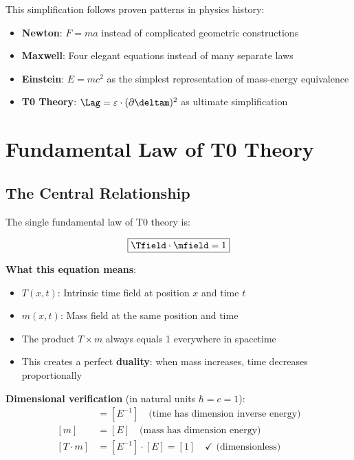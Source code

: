 	This simplification follows proven patterns in physics history:
	\begin{itemize}
		\item \textbf{Newton}: $F = ma$ instead of complicated geometric constructions
		\item \textbf{Maxwell}: Four elegant equations instead of many separate laws
		\item \textbf{Einstein}: $E = mc^2$ as the simplest representation of mass-energy equivalence
		\item \textbf{T0 Theory}: $\Lag = \varepsilon \cdot (\partial \deltam)^2$ as ultimate simplification
	\end{itemize}
	
	\section{Fundamental Law of T0 Theory}
	
	\subsection{The Central Relationship}
	
	The single fundamental law of T0 theory is:
	
	\begin{equation}
		\boxed{\Tfield \cdot \mfield = 1}
		\label{eq:fundamental_law}
	\end{equation}
	
	\textbf{What this equation means}:
	\begin{itemize}
		\item $T(x,t)$: Intrinsic time field at position $x$ and time $t$
		\item $m(x,t)$: Mass field at the same position and time
		\item The product $T \times m$ always equals 1 everywhere in spacetime
		\item This creates a perfect \textbf{duality}: when mass increases, time decreases proportionally
	\end{itemize}
	
	\textbf{Dimensional verification} (in natural units $\hbar = c = 1$):
	\begin{align}
		[T] &= [E^{-1}] \quad \text{(time has dimension inverse energy)} \\
		[m] &= [E] \quad \text{(mass has dimension energy)} \\
		[T \cdot m] &= [E^{-1}] \cdot [E] = [1] \quad \checkmark \text{ (dimensionless)}
	\end{align}
	
